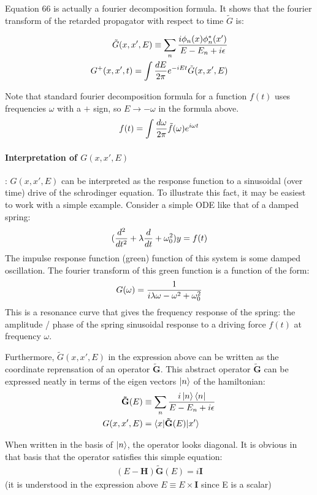 \documentclass[11pt]{article}
\theoremstyle{definition}
\begin{document}
Equation 66 is actually a fourier decomposition formula.  It shows that the fourier transform of the retarded propagator with respect to time $\tilde{G}$ is:

\begin{align}
\tilde{G}(x, x', E) \equiv \sum_n {i \phi_n(x) \phi_n^*(x') \over E - E_n + i \epsilon} \\
G^+(x, x', t) = \int {dE \over 2 \pi} e^{-i E t} \tilde{G}(x, x', E) 
\end{align}

Note that standard fourier decomposition formula for a function $f(t)$ uses frequencies $\omega$ with a $+$ sign, so $E \rightarrow -\omega$ in the formula above.
$$ f(t) = \int {d \omega \over 2 \pi} \tilde{f}(\omega) e^{i \omega t}$$

\paragraph{Interpretation of $G(x, x', E)$}:
$G(x, x', E)$ can be interpreted as the response function to a sinusoidal (over time) drive of the schrodinger equation.  To illustrate this fact, it may be easiest to work with a simple example.  Consider a simple ODE like that of a damped spring: $$({d^2 \over dt^2} + \lambda {d \over dt} +  \omega_0^2) y = f(t)$$
The impulse response function (green) function of this system is some damped oscillation. The fourier transform of this green function is a function of the form:
$$G(\omega) = {1 \over i \lambda \omega - \omega^2 + \omega_0^2}$$
This is a resonance curve that gives the frequency response of the spring: the amplitude / phase of the spring sinusoidal response to a driving force $f(t)$ at frequency $\omega$.

Furthermore, $\tilde{G}(x, x', E)$ in the expression above can be written as the coordinate reprensation of an operator $\mathbf{\tilde{G}}$.
This abstract operator $\mathbf{\tilde{G}}$ can be expressed neatly in terms of the eigen vectors $\ket{n}$ of the hamiltonian:
\begin{align}
\mathbf{\tilde{G}}(E) &\equiv \sum_{n} {i \ket{n} \bra{n} \over E - E_n + i \epsilon} \\
G(x, x', E) &= \braket{x| \mathbf{\tilde{G}}(E)| x'}
\end{align}

When written in the basis of $\ket{n}$, the operator looks diagonal.  It is obvious in that basis that the operator satisfies this simple equation:
\begin{align}
(E - \mathbf{H}) \mathbf{\tilde{G}}(E) =i \mathbf{I}
\end{align}
(it is understood in the expression above $E \equiv E \times \mathbf{I}$ since E is a scalar)
\end{document}
